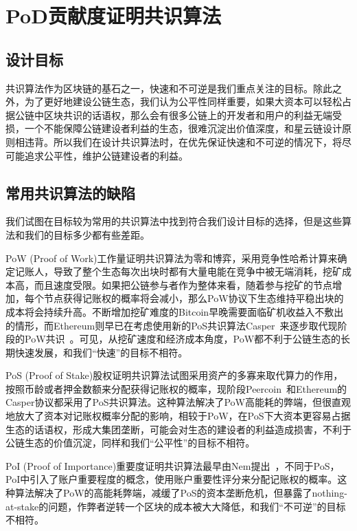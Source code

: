 \section{PoD贡献度证明共识算法}
\label{sec:pod}

\subsection{设计目标}
\label{pod:goals}

共识算法作为区块链的基石之一，快速和不可逆是我们重点关注的目标。除此之外，为了更好地建设公链生态，我们认为公平性同样重要，如果大资本可以轻松占据公链中区块共识的话语权，那么会有很多公链上的开发者和用户的利益无端受损，一个不能保障公链建设者利益的生态，很难沉淀出价值深度，和星云链设计原则相违背。所以我们在设计共识算法时，在优先保证快速和不可逆的情况下，将尽可能追求公平性，维护公链建设者的利益。

\subsection{常用共识算法的缺陷}
\label{pod:weakness}

我们试图在目标较为常用的共识算法中找到符合我们设计目标的选择，但是这些算法和我们的目标多少都有些差距。

PoW (Proof of Work)工作量证明共识算法为零和博弈，采用竞争性哈希计算来确定记账人，导致了整个生态每次出块时都有大量电能在竞争中被无端消耗，挖矿成本高，而且速度受限。如果把公链参与者作为整体来看，随着参与挖矿的节点增加，每个节点获得记账权的概率将会减小，那么PoW协议下生态维持平稳出块的成本将会持续升高。不断增加挖矿难度的Bitcoin早晚需要面临矿机收益入不敷出的情形，而Ethereum则早已在考虑使用新的PoS共识算法Casper~\cite{casper}来逐步取代现阶段的PoW共识~\cite{buterin2013ethereum}。可见，从挖矿速度和经济成本角度，PoW都不利于公链生态的长期快速发展，和我们“快速”的目标不相符。

PoS (Proof of Stake)股权证明共识算法试图采用资产的多寡来取代算力的作用，按照币龄或者押金数额来分配获得记账权的概率，现阶段Peercoin~\cite{king2012peercoin}和Ethereum的Casper协议都采用了PoS共识算法。这种算法解决了PoW高能耗的弊端，但很直观地放大了资本对记账权概率分配的影响，相较于PoW，在PoS下大资本更容易占据生态的话语权，形成大集团垄断，可能会对生态的建设者的利益造成损害，不利于公链生态的价值沉淀，同样和我们“公平性”的目标不相符。

PoI (Proof of Importance)重要度证明共识算法最早由Nem提出~\cite{nem}，不同于PoS，PoI中引入了账户重要程度的概念，使用账户重要性评分来分配记账权的概率。这种算法解决了PoW的高能耗弊端，减缓了PoS的资本垄断危机，但暴露了nothing-at-stake的问题，作弊者逆转一个区块的成本被大大降低，和我们“不可逆”的目标不相符。

